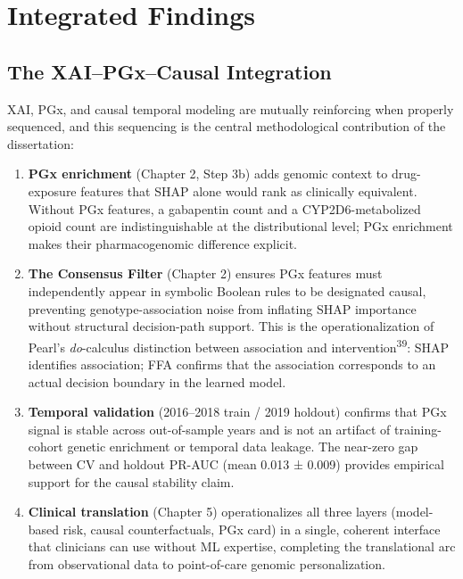 \documentclass[
  12pt,
]{book}
\providecommand{\tightlist}{%
  \setlength{\itemsep}{0pt}\setlength{\parskip}{0pt}}
\begin{document}
\chapter{Integrated Findings}\label{sec-integrated}

\section{The XAI--PGx--Causal
Integration}\label{the-xaipgxcausal-integration}

XAI, PGx, and causal temporal modeling are mutually reinforcing when
properly sequenced, and this sequencing is the central methodological
contribution of the dissertation:

\begin{enumerate}
\def\labelenumi{\arabic{enumi}.}
\tightlist
\item
  \textbf{PGx enrichment} (Chapter 2, Step 3b) adds genomic context to
  drug-exposure features that SHAP alone would rank as clinically
  equivalent. Without PGx features, a gabapentin count and a
  CYP2D6-metabolized opioid count are indistinguishable at the
  distributional level; PGx enrichment makes their pharmacogenomic
  difference explicit.
\item
  \textbf{The Consensus Filter} (Chapter 2) ensures PGx features must
  independently appear in symbolic Boolean rules to be designated
  causal, preventing genotype-association noise from inflating SHAP
  importance without structural decision-path support. This is the
  operationalization of Pearl's \textit{do}-calculus distinction between
  association and intervention\textsuperscript{39}: SHAP identifies
  association; FFA confirms that the association corresponds to an
  actual decision boundary in the learned model.
\item
  \textbf{Temporal validation} (2016--2018 train / 2019 holdout)
  confirms that PGx signal is stable across out-of-sample years and is
  not an artifact of training-cohort genetic enrichment or temporal data
  leakage. The near-zero gap between CV and holdout PR-AUC (mean 0.013 ±
  0.009) provides empirical support for the causal stability claim.
\item
  \textbf{Clinical translation} (Chapter 5) operationalizes all three
  layers (model-based risk, causal counterfactuals, PGx card) in a
  single, coherent interface that clinicians can use without ML
  expertise, completing the translational arc from observational data to
  point-of-care genomic personalization.
\end{enumerate}
\end{document}

